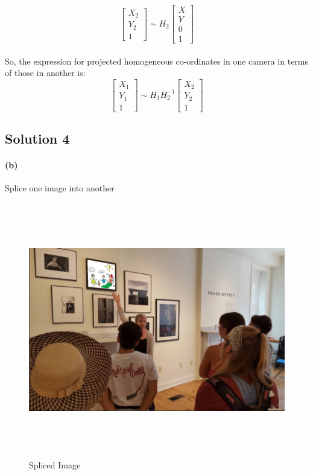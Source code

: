 \documentclass{article}
\newcommand{\solution}[1]{\clearpage \subsection*{Solution #1}}  %
\newcommand{\spart}[1]{\paragraph{(#1)}}
\begin{document}
\begin{equation}
	\left[
		\begin{array}{c}
		X_2 \\ Y_2 \\ 1
		\end{array}
	\right] 
	\sim
	H_2
	\left[
		\begin{array}{c}
		X\\
		Y\\
		0\\
		1
		\end{array}
	\right]
\end{equation}
\\So, the expression for projected homogeneous co-ordinates in one camera in terms of those in another is:
\begin{equation}
	\left[
		\begin{array}{c}
		X_1 \\ Y_1 \\ 1
		\end{array}
	\right] 
	\sim
	H_1H^{-1}_2
	\left[
		\begin{array}{c}
		X_2 \\ Y_2 \\ 1
		\end{array}
	\right] 
\end{equation}



\solution{4}
\spart{b} Splice one image into another
\begin{figure}[h!]
  \centering
	\includegraphics[height=30em]{code/outputs/prob4.png}
	  \caption{Spliced Image}
\end{figure}
\end{document}
